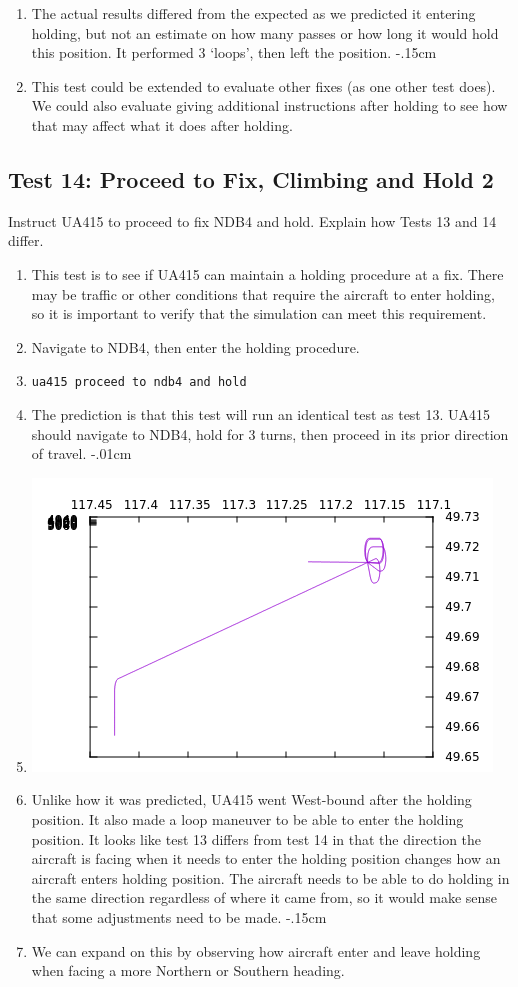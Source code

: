 \documentclass[letterpaper, 12pt]{article}
\begin{document}
\begin{enumerate}
\item The actual results differed from the expected as we predicted it entering holding, but not an estimate on how many passes or how long it would hold this position. It performed 3 ‘loops’, then left the position.
\itemsep-.15cm
\item This test could be extended to evaluate other fixes (as one other test does). We could also evaluate giving additional instructions after holding to see how that may affect what it does after holding.
\end{enumerate}

\subsection{Test 14: Proceed to Fix, Climbing and Hold 2}
Instruct UA415 to proceed to fix NDB4 and hold.
Explain how Tests 13 and 14 differ.
\begin{enumerate}\itemsep-.15cm
\item This test is to see if UA415 can maintain a holding procedure at a fix. There may be traffic or other conditions that require the aircraft to enter holding, so it is important to verify that the simulation can meet this requirement.
\item Navigate to NDB4, then enter the holding procedure.
\item \verb!ua415 proceed to ndb4 and hold!
\item The prediction is that this test will run an identical test as test 13. UA415 should navigate to NDB4, hold for 3 turns, then proceed in its prior direction of travel.
\itemsep-.01cm
\item \includegraphics[scale=.6,valign=t,center]{test14_1.png}
\item Unlike how it was predicted, UA415 went West-bound after the holding position. It also made a loop maneuver to be able to enter the holding position. It looks like test 13 differs from test 14 in that the direction the aircraft is facing when it needs to enter the holding position changes how an aircraft enters holding position. The aircraft needs to be able to do holding in the same direction regardless of where it came from, so it would make sense that some adjustments need to be made.
\itemsep-.15cm
\item We can expand on this by observing how aircraft enter and leave holding when facing a more Northern or Southern heading.
\end{enumerate}
\end{document}
